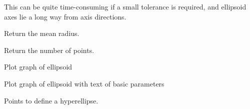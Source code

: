 \documentclass[a4paper,10pt,openany, oneside]{sphinxmanual}
\begin{document}
\begin{fulllineitems}
\begin{fulllineitems}
This can be quite time-consuming if a small tolerance is required, and ellipsoid axes
lie a long way from axis directions.

\end{fulllineitems}


\begin{fulllineitems}
\label{api_reference:distellipsoid.ellipsoid.Ellipsoid.meanrad}
Return the mean radius.

\end{fulllineitems}


\begin{fulllineitems}
\label{api_reference:distellipsoid.ellipsoid.Ellipsoid.numpoints}
Return the number of points.

\end{fulllineitems}


\begin{fulllineitems}
\label{api_reference:distellipsoid.ellipsoid.Ellipsoid.plot}
Plot graph of ellipsoid

\end{fulllineitems}


\begin{fulllineitems}
\label{api_reference:distellipsoid.ellipsoid.Ellipsoid.plotsummary}
Plot graph of ellipsoid with text of basic parameters

\end{fulllineitems}


\begin{fulllineitems}
\label{api_reference:distellipsoid.ellipsoid.Ellipsoid.points}
Points to define a hyperellipse.

\end{fulllineitems}


\end{fulllineitems}
\end{document}
